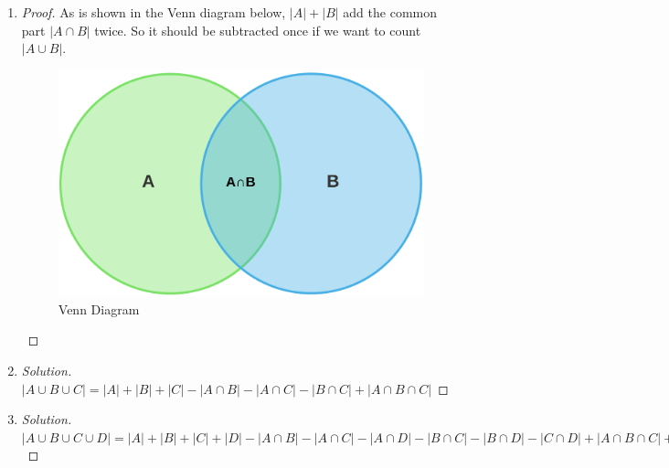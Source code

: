 \documentclass[12pt,a4]{article}
\theoremstyle{exercise}
\newenvironment{solution}
  {\renewcommand\qedsymbol{$\blacksquare$}\begin{proof}[Solution]}
  {\end{proof}}
\begin{document}
\begin{enumerate}
\item \begin{proof}
As is shown in the Venn diagram below, $\left\vert{A}\right\vert + \left\vert{B}\right\vert$ add the common part $\left\vert{A\cap B}\right\vert $ twice. So it should be subtracted once if we want to count $\left\vert{A \cup B}\right\vert $.
\begin{figure}[h]
\centering
\includegraphics[scale=0.1]{Venn}
\caption{Venn Diagram}
\end{figure}
\end{proof}
\item \begin{solution}
$\left\vert{A\cup B\cup C}\right\vert = \left\vert{A}\right\vert + \left\vert{B}\right\vert + \left\vert{C}\right\vert - \left\vert{A\cap B}\right\vert - \left\vert{A\cap C}\right\vert - \left\vert{B \cap C}\right\vert + \left\vert{A\cap B \cap C}\right\vert$
\end{solution}
\item \begin{solution}
$\left\vert{A\cup B\cup C \cup D}\right\vert = \left\vert{A}\right\vert + \left\vert{B}\right\vert + \left\vert{C}\right\vert + \left\vert{D}\right\vert - \left\vert{A\cap B}\right\vert - \left\vert{A\cap C}\right\vert - \left\vert{A \cap D}\right\vert - \left\vert{B \cap C}\right\vert - \left\vert{B \cap D}\right\vert - \left\vert{C \cap D}\right\vert + \left\vert{A\cap B \cap C}\right\vert + \left\vert{A\cap B \cap D}\right\vert + \left\vert{A\cap C \cap D}\right\vert + \left\vert{B\cap C \cap D}\right\vert - \left\vert{A\cap B \cap C\cap D}\right\vert$
\end{solution}
\end{enumerate}
\end{document}
